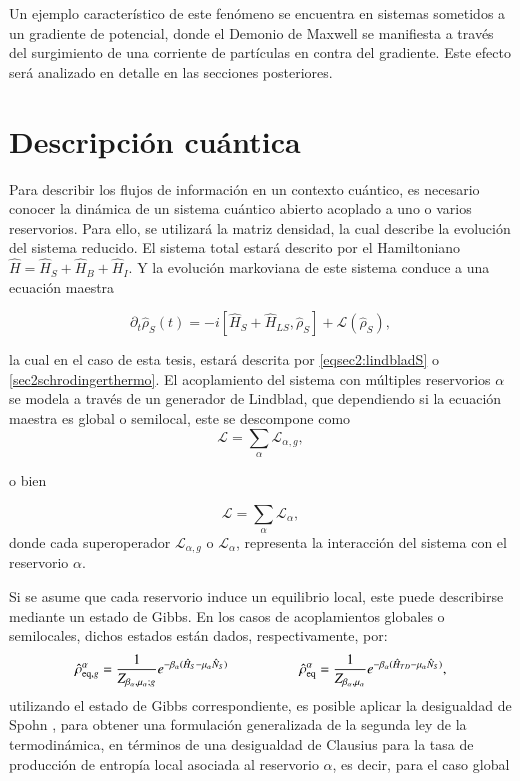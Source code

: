 Un ejemplo característico de este fenómeno se encuentra en sistemas sometidos a un gradiente de potencial, donde el Demonio de Maxwell se manifiesta a través del surgimiento de una corriente de partículas en contra del gradiente. Este efecto será analizado en detalle en las secciones posteriores.


\section{Descripción cuántica}
Para describir los flujos de información en un contexto cuántico, es necesario conocer la dinámica de un sistema cuántico abierto acoplado a uno o varios reservorios. Para ello, se utilizará la matriz densidad, la cual describe la evolución del sistema reducido. El sistema total estará descrito por el Hamiltoniano $\hat{H} = \hat{H}_{S} + \hat{H}_{B} + \hat{H}_{I}$. Y la evolución markoviana de este sistema conduce a una ecuación maestra

\begin{equation*}
    \partial_{t}\hat{\rho}_{S}(t) = - i[\hat{H}_{S} + \hat{H}_{LS},\hat{\rho}_{S}] + \mathcal{L}(\hat{\rho}_{S}),
\end{equation*}

la cual en el caso de esta tesis, estará descrita por \ref{eqsec2:lindbladS} o \ref{sec2schrodingerthermo}. El acoplamiento del sistema con múltiples reservorios $\alpha$ se modela a través de un generador de Lindblad, que dependiendo si la ecuación maestra es global o semilocal, este se descompone como
\begin{equation*}
    \mathcal{L} = \sum_{\alpha} \mathcal{L}_{\alpha,g},
\end{equation*}

o bien

\begin{equation*}
     \mathcal{L} = \sum_{\alpha} \mathcal{L}_{\alpha},
\end{equation*}
donde cada superoperador $\mathcal{L}_{\alpha,g}$ o $\mathcal{L}_{\alpha}$, representa la interacción del sistema con el reservorio $\alpha$. 



Si se asume que cada reservorio induce un equilibrio local, este puede describirse mediante un estado de Gibbs. En los casos de acoplamientos globales o semilocales, dichos estados están dados, respectivamente, por:
\begin{equation*}
    \hat{\rho}_{\text{eq},g}^{\alpha} = \frac{1}{Z_{\beta_\alpha, \mu_\alpha;g}} e^{-\beta_\alpha (\hat{H}_S - \mu_\alpha \hat{N}_{S})} \hspace{18mm}  \hat{\rho}_{\text{eq}}^{\alpha} = \frac{1}{Z_{\beta_\alpha, \mu_\alpha}} e^{-\beta_\alpha (\hat{H}_{TD} - \mu_\alpha \hat{N}_{S})}, 
\end{equation*}
utilizando el estado de Gibbs correspondiente, es posible aplicar la desigualdad de Spohn \cite{spohn1978entropy}, para obtener una formulación generalizada de la segunda ley de la termodinámica, en términos de una desigualdad de Clausius para la tasa de producción de entropía local asociada al reservorio $\alpha$, es decir, para el caso global

